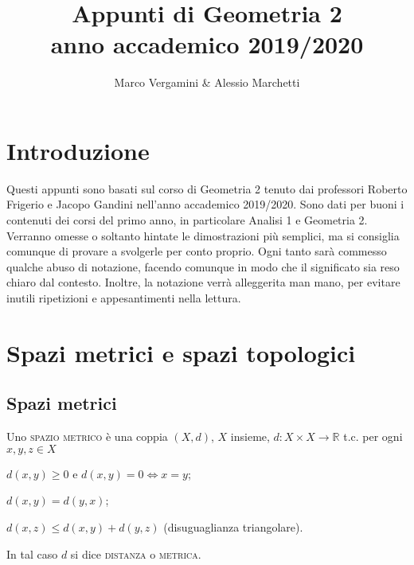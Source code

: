 \documentclass{article}
\title{Appunti di Geometria 2 \\ anno accademico 2019/2020}
\date{}
\author{Marco Vergamini & Alessio Marchetti}
\begin{document}
\maketitle
\newpage
\tableofcontents
\newpage

\section{Introduzione}
Questi appunti sono basati sul corso di Geometria 2 tenuto dai professori
Roberto Frigerio e Jacopo Gandini nell'anno accademico 2019/2020. Sono dati per
buoni i contenuti dei corsi del primo anno, in particolare Analisi 1 e Geometria
2. Verranno omesse o soltanto hintate le dimostrazioni più semplici, ma si
consiglia comunque di provare a svolgerle per conto proprio. Ogni tanto sarà
commesso qualche abuso di notazione, facendo comunque in modo che il significato
sia reso chiaro dal contesto. Inoltre, la notazione verrà alleggerita man mano,
per evitare inutili ripetizioni e appesantimenti nella lettura.

\section{Spazi metrici e spazi topologici}
\subsection{Spazi metrici}
\begin{defn}
	Uno \textsc{spazio metrico} è una coppia $(X, d)$, $X$ insieme,
	${d: X \times X \rightarrow \mathbb{R}}$ t.c. per ogni ${x, y, z \in X}$
    \begin{nlist}
	\item $d(x, y) \ge 0$ e $d(x, y)=0 \Leftrightarrow x=y$;
	\item $d(x, y)=d(y, x)$;
	\item $d(x, z) \le d(x, y)+d(y,z)$ (disuguaglianza triangolare).
    \end{nlist}
	In tal caso $d$ si dice \textsc{distanza} o \textsc{metrica}.
\end{defn}
\end{document}
